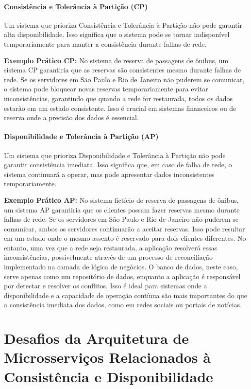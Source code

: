 \subsubsection{Consistência e Tolerância à Partição (CP)}

Um sistema que prioriza Consistência e Tolerância à Partição não pode garantir alta disponibilidade. Isso significa que o sistema pode se tornar indisponível temporariamente para manter a consistência durante falhas de rede.

\textbf{Exemplo Prático CP:} No sistema de reserva de passagens de ônibus, um sistema CP garantiria que as reservas são consistentes mesmo durante falhas de rede. Se os servidores em São Paulo e Rio de Janeiro não puderem se comunicar, o sistema pode bloquear novas reservas temporariamente para evitar inconsistências, garantindo que quando a rede for restaurada, todos os dados estarão em um estado consistente. Isso é crucial em sistemas financeiros ou de reserva onde a precisão dos dados é essencial.

\subsubsection{Disponibilidade e Tolerância à Partição (AP)}

Um sistema que prioriza Disponibilidade e Tolerância à Partição não pode garantir consistência imediata. Isso significa que, em caso de falha de rede, o sistema continuará a operar, mas pode apresentar dados inconsistentes temporariamente.

\textbf{Exemplo Prático AP:} No sistema fictício de reserva de passagens de ônibus, um sistema AP garantiria que os clientes possam fazer reservas mesmo durante falhas de rede. Se os servidores em São Paulo e Rio de Janeiro não puderem se comunicar, ambos os servidores continuarão a aceitar reservas. Isso pode resultar em um estado onde o mesmo assento é reservado para dois clientes diferentes. No entanto, uma vez que a rede seja restaurada, a aplicação resolverá essas inconsistências, possivelmente através de um processo de reconciliação implementado na camada de lógica de negócios. O banco de dados, neste caso, serve apenas como um repositório de dados, enquanto a aplicação é responsável por detectar e resolver os conflitos. Isso é ideal para sistemas onde a disponibilidade e a capacidade de operação contínua são mais importantes do que a consistência imediata dos dados, como em redes sociais ou portais de notícias.


\chapter{Desafios da Arquitetura de Microsserviços Relacionados à Consistência e Disponibilidade}

